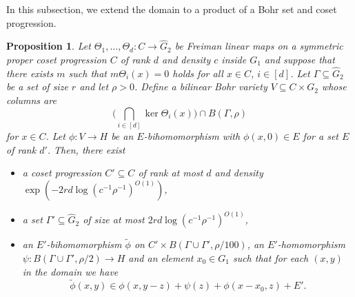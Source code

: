 \documentclass[a4paper,11pt]{article}
\numberwithin{theorem}{section}
\newtheorem{proposition}[theorem]{Proposition}
\theoremstyle{definition}
\newcommand{\on}[1]{
	\operatorname{#1}
}
\begin{document}
In this subsection, we extend the domain to a product of a Bohr set and coset progression. 

\begin{proposition}\label{finalExtensionStep3}
    Let $\Theta_1, \dots, \Theta_d : C \to \hat{G}_2$ be Freiman linear maps on a symmetric proper coset progression $C$ of rank $d$ and density $c$ inside $G_1$ and suppose that there exists $m$ such that $m \Theta_i(x) = 0$ holds for all $x \in C$, $i \in [d]$. Let $\Gamma \subseteq \hat{G}_2$ be a set of size $r$ and let $\rho > 0$. Define a bilinear Bohr variety $V \subseteq C \times G_2$ whose columns are
    \[\Big(\bigcap_{i \in [d]}\on{ker} \Theta_i(x) \Big)\cap B(\Gamma, \rho)\]
    for $x \in C$. Let $\phi : V \to H$ be an $E$-bihomomorphism with $\phi(x, 0) \in E$ for a set $E$ of rank $d'$. Then, there exist 
    \begin{itemize}
        \item a coset progression $C' \subseteq C$ of rank at most $d$ and density $\exp(-2rd\log(c^{-1}\rho^{-1})^{O(1)})$,
        \item a set $\Gamma' \subseteq \hat{G}_2$ of size at most $2rd\log(c^{-1}\rho^{-1})^{O(1)}$,
        \item an $E'$-bihomomorphism $\tilde{\phi}$ on $C' \times B(\Gamma \cup \Gamma', \rho/100)$, an $E'$-homomorphism $\psi : B(\Gamma \cup \Gamma', \rho /2) \to H$ and an element $x_0 \in G_1$ such that for each $(x,y)$ in the domain we have 
        \[\tilde{\phi}(x,y) \in \phi(x, y - z) + \psi(z) + \phi(x - x_0, z) + E'.\]
    \end{itemize}
\end{proposition}
\end{document}
